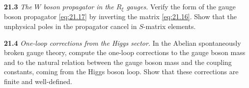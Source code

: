 \textbf{21.3} \emph{The $W$ boson propagator in the $R_\xi$ gauges.}  Verify
the form of the gauge boson propagator \eqref{eq:21.17} by inverting the
matrix \eqref{eq:21.16}.  Show that the unphysical poles in the propagator
cancel in $S$-matrix elements.

\textbf{21.4} \emph{One-loop corrections from the Higgs sector.}  In the
Abelian spontaneously broken gauge theory, compute the one-loop corrections
to the gauge boson mass and to the natural relation between the gauge boson
mass and the coupling constants, coming from the Higgs boson loop.  Show
that these corrections are finite and well-defined.
